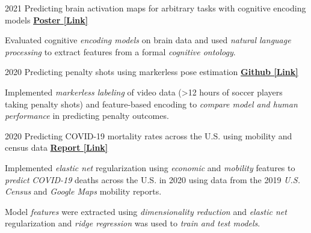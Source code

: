 \begin{cventries}
  \cventry
    {2021} %
    {Predicting brain activation maps for arbitrary tasks with cognitive encoding models} %
    {\href{https://drive.google.com/file/d/1dRNSsRzGSSF9QJLJv_jK1R7BmmWfOsMt/view}{\textbf{Poster [Link]}}}
    {}
    {
      \begin{cvitems} %
      	\item {Evaluated cognitive \textit{encoding models} on brain data and used \textit{natural language processing} to extract features from a formal \textit{cognitive ontology}.}
      \end{cvitems}
    }   
    
    
  \cventry
    {2020} %
    {Predicting penalty shots using markerless pose estimation} %
    {\href{https://github.com/maedbhk/action_prediction}{\textbf{Github [Link]}}}
    {}
    {
      \begin{cvitems} %
      	\item {Implemented \textit{markerless labeling} of video data (>12 hours of soccer players taking penalty shots) and feature-based encoding to \textit{compare model and human performance} in predicting penalty outcomes.}
      \end{cvitems}
    }   
    
 \cventry
   {2020} %
   {Predicting COVID-19 mortality rates across the U.S. using mobility and census data} %
    {\href{https://drive.google.com/file/d/1l9TLGLmstkJsvOJQPxHe_f35b4fEkDU4/view}{\textbf{Report [Link]}}}
    {}
    {
      \begin{cvitems} %
      	\item {Implemented \textit{elastic net} regularization using \textit{economic} and \textit{mobility} features to \textit{predict} \textit{COVID-19} deaths across the U.S. in 2020 using data from the 2019 \textit{U.S. Census} and \textit{Google Maps} mobility reports.}
      	\item {Model \textit{features} were extracted using \textit{dimensionality reduction} and \textit{elastic net} regularization and \textit{ridge regression} was used to \textit{train and test models}.}
      \end{cvitems}
    }
    
\end{cventries}
